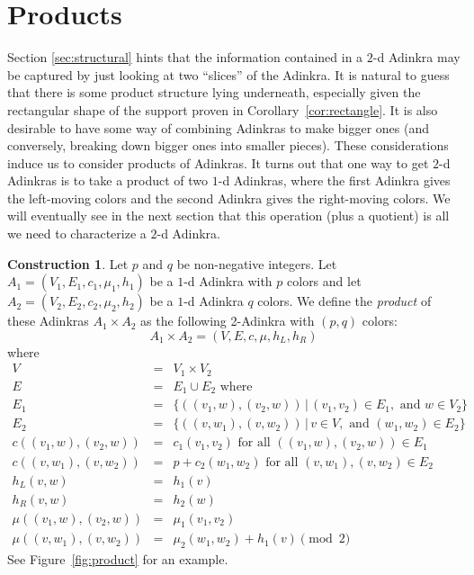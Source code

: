 \documentclass[12pt,twoside,singlespace]{article}
\numberwithin{equation}{section}
\theoremstyle{definition}
\newtheorem{construction}[equation]{Construction}
\begin{document}
\section{Products}
\label{sec:products}

Section \ref{sec:structural} hints that the information contained in a $2$-d Adinkra may be captured by just looking at two ``slices'' of the Adinkra. It is natural to guess that there is some product structure lying underneath, especially given the rectangular shape of the support proven in Corollary~\ref{cor:rectangle}. It is also desirable to have some way of combining Adinkras to make bigger ones (and conversely, breaking down bigger ones into smaller pieces). These considerations induce us to consider products of Adinkras. It turns out that one way to get $2$-d Adinkras is to take a product of two $1$-d Adinkras, where the first Adinkra gives the left-moving colors and the second Adinkra gives the right-moving colors. We will eventually see in the next section that this operation (plus a quotient) is all we need to characterize a $2$-d Adinkra.

\begin{construction}
\label{const:product}
Let $p$ and $q$ be non-negative integers.  Let $A_1=(V_1, E_1, c_1, \mu_1,h_1)$ be a $1$-d Adinkra with $p$ colors and let $A_2=(V_2, E_2, c_2, \mu_2,h_2)$ be a $1$-d Adinkra $q$ colors.  We define the \emph{product} of these Adinkras $A_1\times A_2$ as the following 2-Adinkra with $(p,q)$ colors:
\[A_1\times A_2=(V,E,c,\mu,h_L,h_R)\]
where
\begin{eqnarray*}
V&=&V_1\times V_2\\
E&=&E_1\cup E_2\mbox{ where}\\
E_1&=&\{((v_1,w),(v_2,w))\,|\,(v_1, v_2)\in E_1,\mbox{ and } w\in V_2\}\\
E_2&=&\{((v,w_1),(v,w_2))\,|\,v\in V, \mbox{ and }(w_1,w_2)\in E_2\}\\
c((v_1,w),(v_2,w))&=&c_1(v_1,v_2)\mbox{ for all $((v_1,w),(v_2,w))\in E_1$}\\
c((v,w_1),(v,w_2))&=&p+c_2(w_1,w_2)\mbox{ for all $(v,w_1),(v,w_2)\in E_2$}\\
h_L(v,w)&=&h_1(v)\\
h_R(v,w)&=&h_2(w)\\
\mu((v_1,w),(v_2,w))&=&\mu_1(v_1,v_2)\\
\mu((v,w_1),(v,w_2))&=&\mu_2(w_1,w_2)+h_1(v)\pmod{2}
\end{eqnarray*}
See Figure~\ref{fig:product} for an example.
\end{construction}
\end{document}

